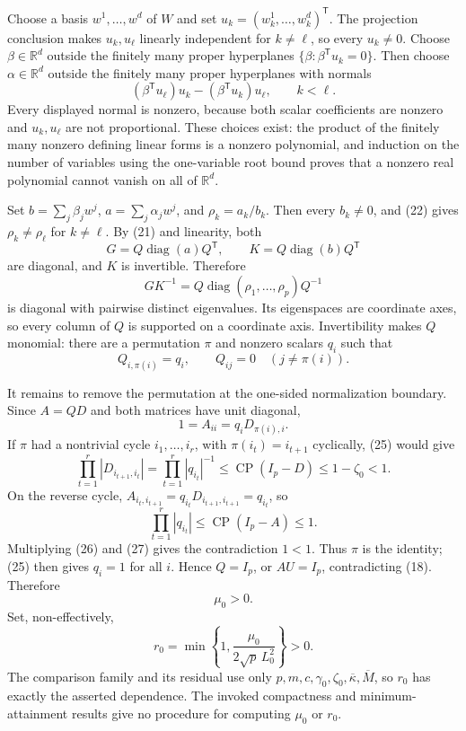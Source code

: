 Choose a basis \(w^1,\ldots,w^d\) of \(W\) and set \(u_k=(w^1_k,\ldots,w^d_k)^{\mathsf T}\). The projection conclusion makes \(u_k,u_\ell\) linearly independent for \(k\ne\ell\), so every \(u_k\ne0\). Choose \(\beta\in\mathbb R^d\) outside the finitely many proper hyperplanes \(\{\beta:\beta^{\mathsf T}u_k=0\}\). Then choose \(\alpha\in\mathbb R^d\) outside the finitely many proper hyperplanes with normals
\[
(\beta^{\mathsf T}u_\ell)u_k-(\beta^{\mathsf T}u_k)u_\ell,
\qquad k<\ell.
\tag{22}
\]
Every displayed normal is nonzero, because both scalar coefficients are nonzero and \(u_k,u_\ell\) are not proportional. These choices exist: the product of the finitely many nonzero defining linear forms is a nonzero polynomial, and induction on the number of variables using the one-variable root bound proves that a nonzero real polynomial cannot vanish on all of \(\mathbb R^d\).

Set \(b=\sum_j\beta_jw^j\), \(a=\sum_j\alpha_jw^j\), and \(\rho_k=a_k/b_k\). Then every \(b_k\ne0\), and (22) gives \(\rho_k\ne\rho_\ell\) for \(k\ne\ell\). By (21) and linearity, both
\[
G=Q\operatorname{diag}(a)Q^{\mathsf T},
\qquad
K=Q\operatorname{diag}(b)Q^{\mathsf T}
\]
are diagonal, and \(K\) is invertible. Therefore
\[
GK^{-1}=Q\operatorname{diag}(\rho_1,\ldots,\rho_p)Q^{-1}
\tag{23}
\]
is diagonal with pairwise distinct eigenvalues. Its eigenspaces are coordinate axes, so every column of \(Q\) is supported on a coordinate axis. Invertibility makes \(Q\) monomial: there are a permutation \(\pi\) and nonzero scalars \(q_i\) such that
\[
Q_{i,\pi(i)}=q_i,
\qquad Q_{ij}=0\quad(j\ne\pi(i)).
\tag{24}
\]

It remains to remove the permutation at the one-sided normalization boundary. Since \(A=QD\) and both matrices have unit diagonal,
\[
1=A_{ii}=q_iD_{\pi(i),i}.
\tag{25}
\]
If \(\pi\) had a nontrivial cycle \(i_1,\ldots,i_r\), with \(\pi(i_t)=i_{t+1}\) cyclically, (25) would give
\[
\prod_{t=1}^r|D_{i_{t+1},i_t}|
=\prod_{t=1}^r|q_{i_t}|^{-1}
\leq\operatorname{CP}(I_p-D)
\leq1-\zeta_0<1.
\tag{26}
\]
On the reverse cycle, \(A_{i_t,i_{t+1}}=q_{i_t}D_{i_{t+1},i_{t+1}}=q_{i_t}\), so
\[
\prod_{t=1}^r|q_{i_t}|
\leq\operatorname{CP}(I_p-A)
\leq1.
\tag{27}
\]
Multiplying (26) and (27) gives the contradiction \(1<1\). Thus \(\pi\) is the identity; (25) then gives \(q_i=1\) for all \(i\). Hence \(Q=I_p\), or \(AU=I_p\), contradicting (18). Therefore
\[
\mu_0>0.
\tag{28}
\]
Set, non-effectively,
\[
r_0=\min\left\{1,\frac{\mu_0}{2\sqrt p\,L_0^2}\right\}>0.
\tag{29}
\]
The comparison family and its residual use only \(p,m,c,\gamma_0,\zeta_0,\overline\kappa,\overline M\), so \(r_0\) has exactly the asserted dependence. The invoked compactness and minimum-attainment results give no procedure for computing \(\mu_0\) or \(r_0\).

